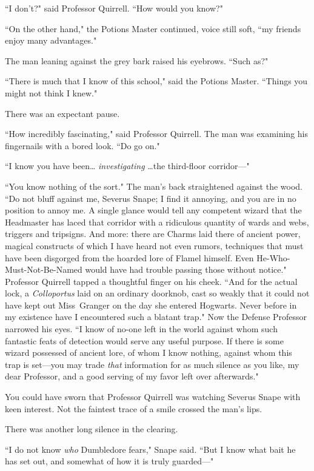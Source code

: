 ``I don't?" said Professor Quirrell. ``How would you know?"

``On the other hand," the Potions Master continued, voice still soft, ``my friends enjoy many advantages."

The man leaning against the grey bark raised his eyebrows. ``Such as?"

``There is much that I know of this school," said the Potions Master. ``Things you might not think I knew."

There was an expectant pause.

``How incredibly fascinating," said Professor Quirrell. The man was examining his fingernails with a bored look. ``Do go on."

``I know you have been{\ldots} \emph{investigating} {\ldots}the third-floor corridor—"

``You know nothing of the sort." The man's back straightened against the wood. ``Do not bluff against me, Severus Snape; I find it annoying, and you are in no position to annoy me. A single glance would tell any competent wizard that the Headmaster has laced that corridor with a ridiculous quantity of wards and webs, triggers and tripsigns. And more: there are Charms laid there of ancient power, magical constructs of which I have heard not even rumors, techniques that must have been disgorged from the hoarded lore of Flamel himself. Even He-Who-Must-Not-Be-Named would have had trouble passing those without notice." Professor Quirrell tapped a thoughtful finger on his cheek. ``And for the actual lock, a \emph{Colloportus} laid on an ordinary doorknob, cast so weakly that it could not have kept out Miss~Granger on the day she entered Hogwarts. Never before in my existence have I encountered such a blatant trap." Now the Defense Professor narrowed his eyes. ``I know of no-one left in the world against whom such fantastic feats of detection would serve any useful purpose. If there is some wizard possessed of ancient lore, of whom I know nothing, against whom this trap is set—you may trade \emph{that} information for as much silence as you like, my dear Professor, and a good serving of my favor left over afterwards."

You could have sworn that Professor Quirrell was watching Severus Snape with keen interest. Not the faintest trace of a smile crossed the man's lips.

There was another long silence in the clearing.

``I do not know \emph{who} Dumbledore fears," Snape said. ``But I know what bait he has set out, and somewhat of how it is truly guarded—"

